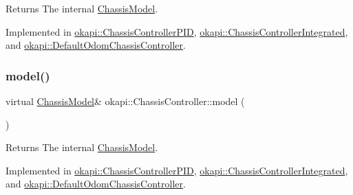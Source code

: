 \begin{DoxyReturn}{Returns}
The internal \mbox{\hyperlink{classokapi_1_1ChassisModel}{Chassis\+Model}}. 
\end{DoxyReturn}


Implemented in \mbox{\hyperlink{classokapi_1_1ChassisControllerPID_adffe6c9a65b6bd7664e0a884638d9097}{okapi\+::\+Chassis\+Controller\+P\+ID}}, \mbox{\hyperlink{classokapi_1_1ChassisControllerIntegrated_a60c9a11616a2a41400c17952c36a5b57}{okapi\+::\+Chassis\+Controller\+Integrated}}, and \mbox{\hyperlink{classokapi_1_1DefaultOdomChassisController_a83e8bf7115086c331ada990ceb872bf1}{okapi\+::\+Default\+Odom\+Chassis\+Controller}}.

\mbox{\label{classokapi_1_1ChassisController_a239802eda7e4317a65d1a04994f7b97e}} 
\subsubsection{\texorpdfstring{model()}{model()}}
{\footnotesize\ttfamily virtual \mbox{\hyperlink{classokapi_1_1ChassisModel}{Chassis\+Model}}\& okapi\+::\+Chassis\+Controller\+::model (\begin{DoxyParamCaption}{ }\end{DoxyParamCaption})\hspace{0.3cm}{\ttfamily [pure virtual]}}

\begin{DoxyReturn}{Returns}
The internal \mbox{\hyperlink{classokapi_1_1ChassisModel}{Chassis\+Model}}. 
\end{DoxyReturn}


Implemented in \mbox{\hyperlink{classokapi_1_1ChassisControllerPID_a225446cae7b569ff104d41d9aa2ae9b8}{okapi\+::\+Chassis\+Controller\+P\+ID}}, \mbox{\hyperlink{classokapi_1_1ChassisControllerIntegrated_a726fc6cd37748b860e56ddb586b5555a}{okapi\+::\+Chassis\+Controller\+Integrated}}, and \mbox{\hyperlink{classokapi_1_1DefaultOdomChassisController_aa917086153b6298bf7792fd3b31ac240}{okapi\+::\+Default\+Odom\+Chassis\+Controller}}.

\mbox{\label{classokapi_1_1ChassisController_a6d5b69139dfa8b814d05c74c22bcaa43}} 
